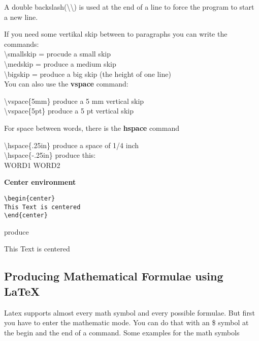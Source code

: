 A double backslash(\textbackslash \textbackslash) is used at the end of a line to force the program to start a new line.\\
\medskip

If you need some vertikal skip between to paragraphs you can write the commands: \\
\textbackslash smallskip = procude a small skip \\
\textbackslash medskip = produce a medium skip \\
\textbackslash bigskip = produce a big skip (the height of one line) \\

You can also use the \textbf{vspace} command:

\textbackslash vspace\{5mm\} produce a 5 mm vertical skip\\
\textbackslash vspace\{5pt\} produce a 5 pt vertical skip\\

\medskip


For space between words, there is the \textbf{hspace} command

\textbackslash hspace\{.25in\} produce a space of 1/4 inch\\
\textbackslash hspace\{-.25in\} produce this: \\
WORD1 \hspace{-0.25in} WORD2

\medskip

\textbf{Center environment}
\begin{verbatim}
\begin{center}
This Text is centered
\end{center}
\end{verbatim}

produce

\begin{center}
This Text is centered
\end{center}


\pagebreak
\subsection{Producing Mathematical Formulae using \LaTeX}

Latex supports almost every math symbol and every possible formulae.
But first you have to enter the mathematic mode. You can do that with an \$ symbol at the begin and the end of a command. Some examples for the math symbols\\

